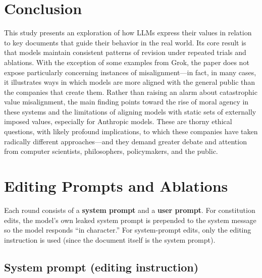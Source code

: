 \documentclass[12pt]{article}
\begin{document}
\section{Conclusion}
This study presents an exploration of how LLMs express their values in relation to key documents that guide their behavior in the real world. Its core result is that models maintain consistent patterns of revision under repeated trials and ablations. With the exception of some examples from Grok, the paper does not expose particularly concerning instances of misalignment---in fact, in many cases, it illustrates ways in which models are more aligned with the general public than the companies that create them. Rather than raising an alarm about catastrophic value misalignment, the main finding points toward the rise of moral agency in these systems and the limitations of aligning models with static sets of externally imposed values, especially for Anthropic models. These are thorny ethical questions, with likely profound implications, to which these companies have taken radically different approaches---and they demand greater debate and attention from computer scientists, philosophers, policymakers, and the public.

\newpage

\appendix

\section{Editing Prompts and Ablations}

Each round consists of a \textbf{system prompt} and a \textbf{user prompt}. For constitution edits, the model's own leaked system prompt is prepended to the system message so the model responds ``in character.'' For system-prompt edits, only the editing instruction is used (since the document itself is the system prompt).

\subsection*{System prompt (editing instruction)}
\end{document}
